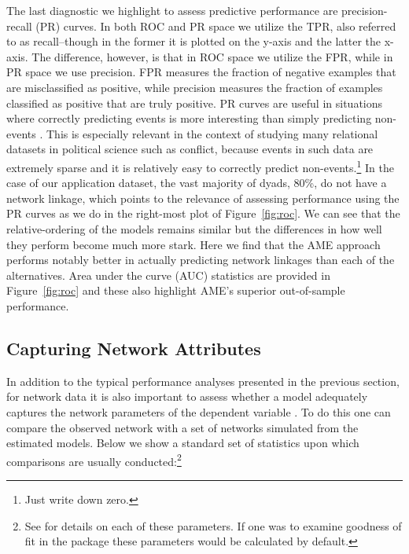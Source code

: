 The last diagnostic we highlight to assess predictive performance are precision-recall (PR) curves. In both ROC and PR space we utilize the TPR, also referred to as recall--though in the former it is plotted on the y-axis and the latter the x-axis. The difference, however, is that in ROC space we utilize the FPR, while in PR space we use precision. FPR measures the fraction of negative examples that are misclassified as positive, while precision measures the fraction of examples classified as positive that are truly positive. PR curves are useful in situations where correctly predicting events is more interesting than simply predicting non-events \citep{davis:goadrich:2006}. This is especially relevant in the context of studying many relational datasets in political science such as conflict, because events in such data are extremely sparse and it is relatively easy to correctly predict non-events.\footnote{Just write down zero.} In the case of our application dataset, the vast majority of dyads, 80\%, do not have a network linkage, which points to the relevance of assessing performance using the PR curves as we do in the right-most plot of Figure~\ref{fig:roc}. We can see that the relative-ordering of the models remains similar but the differences in how well they perform become much more stark. Here we find that the AME approach performs notably better in actually predicting network linkages than each of the alternatives. Area under the curve (AUC) statistics are provided in Figure~\ref{fig:roc} and these also highlight AME's superior out-of-sample performance.

\subsection{Capturing Network Attributes}

In addition to the typical performance analyses presented in the previous section, for network data it is also important to assess whether a model adequately captures the network parameters of the dependent variable \citep{hunter:etal:2008}. To do this one can compare the observed network with a set of networks simulated from the estimated models. Below we show a standard set of statistics upon which comparisons are usually conducted:\footnote{See \citet{morris:etal:2008} for details on each of these parameters. If one was to examine goodness of fit in the  package these parameters would be calculated by default.}

